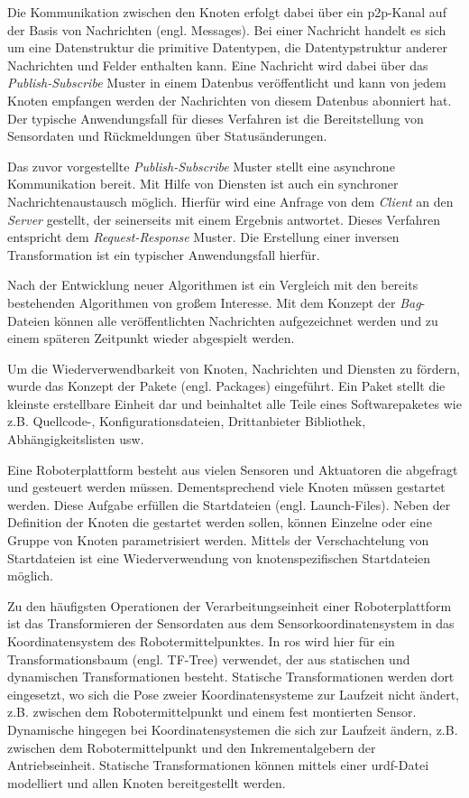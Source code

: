 Die Kommunikation zwischen den Knoten erfolgt dabei über ein \Gls{p2p}-Kanal auf der Basis von Nachrichten (engl. Messages). Bei einer Nachricht handelt es sich um eine Datenstruktur die primitive Datentypen, die Datentypstruktur anderer Nachrichten und Felder enthalten kann. Eine Nachricht wird dabei über das \textit{Publish-Subscribe} Muster in einem Datenbus veröffentlicht und kann von jedem Knoten empfangen werden der Nachrichten von diesem Datenbus abonniert hat. Der typische Anwendungsfall für dieses Verfahren ist die Bereitstellung von Sensordaten und Rückmeldungen über Statusänderungen.

Das zuvor vorgestellte \textit{Publish-Subscribe} Muster stellt eine asynchrone Kommunikation bereit. Mit Hilfe von Diensten ist auch ein synchroner Nachrichtenaustausch möglich. Hierfür wird eine Anfrage von dem \textit{Client} an den \textit{Server} gestellt, der seinerseits mit einem Ergebnis antwortet. Dieses Verfahren entspricht dem \textit{Request-Response} Muster. Die Erstellung einer inversen Transformation ist ein typischer Anwendungsfall hierfür.

Nach der Entwicklung neuer Algorithmen ist ein Vergleich mit den bereits bestehenden Algorithmen von großem Interesse. Mit dem Konzept der \textit{Bag}-Dateien können alle veröffentlichten Nachrichten aufgezeichnet werden und zu einem späteren Zeitpunkt wieder abgespielt werden.

Um die Wiederverwendbarkeit von Knoten, Nachrichten und Diensten zu fördern, wurde das Konzept der Pakete (engl. Packages) eingeführt. Ein Paket stellt die kleinste erstellbare Einheit dar und beinhaltet alle Teile eines Softwarepaketes wie z.B. Quellcode-, Konfigurationsdateien, Drittanbieter Bibliothek, Abhängigkeitslisten usw.

Eine Roboterplattform besteht aus vielen Sensoren und Aktuatoren die abgefragt und gesteuert werden müssen. Dementsprechend viele Knoten müssen gestartet werden. Diese Aufgabe erfüllen die Startdateien (engl. Launch-Files). Neben der Definition der Knoten die gestartet werden sollen, können Einzelne oder eine Gruppe von Knoten parametrisiert werden. Mittels der Verschachtelung von Startdateien ist eine Wiederverwendung von knotenspezifischen Startdateien möglich.

Zu den häufigsten Operationen der Verarbeitungseinheit einer Roboterplattform ist das Transformieren der Sensordaten aus dem Sensorkoordinatensystem in das Koordinatensystem des Robotermittelpunktes. In \Gls{ros} wird hier für ein Transformationsbaum (engl. TF-Tree) verwendet, der aus statischen und dynamischen Transformationen besteht. Statische Transformationen werden dort eingesetzt, wo sich die Pose zweier Koordinatensysteme zur Laufzeit nicht ändert, z.B. zwischen dem Robotermittelpunkt und einem fest montierten Sensor. Dynamische hingegen bei Koordinatensystemen die sich zur Laufzeit ändern, z.B. zwischen dem Robotermittelpunkt und den Inkrementalgebern der Antriebseinheit. Statische Transformationen können mittels einer \Gls{urdf}-Datei modelliert und allen Knoten bereitgestellt werden.

